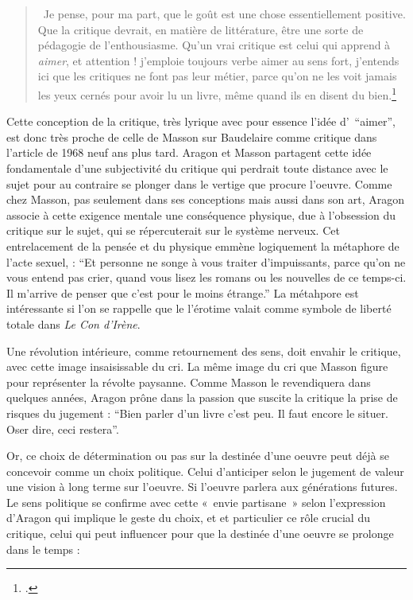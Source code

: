     \begin{quote}
       Je pense, pour ma part, que le goût est une chose essentiellement positive. Que la critique devrait, en matière de littérature, être une sorte de pédagogie de l’enthousiasme. Qu’un vrai critique est celui qui apprend à \emph{aimer}, et attention ! j’emploie toujours verbe aimer au sens fort, j’entends ici que les critiques ne font pas leur métier, parce qu’on ne les voit jamais les yeux cernés pour avoir lu un livre, même quand ils en disent du bien.\footcite{atraversgaleries}    
     \end{quote}


	 Cette conception de la critique, très lyrique avec pour essence l’idée d’ \enquote{aimer},  est donc très proche de celle de Masson sur Baudelaire comme critique dans l’article de 1968 neuf ans plus tard. Aragon et Masson partagent cette idée fondamentale d’une subjectivité du critique qui perdrait toute distance avec le sujet pour au contraire se plonger dans le vertige que procure l’oeuvre. Comme chez Masson, pas seulement dans ses conceptions mais aussi dans son art, Aragon associe à cette exigence mentale une conséquence physique, due à l’obsession du critique sur le sujet, qui se répercuterait sur le système nerveux. Cet entrelacement de la pensée et du physique emmène logiquement la métaphore de l’acte sexuel, : \enquote{Et personne ne songe à vous traiter d’impuissants, parce qu’on ne vous entend pas crier, quand vous lisez les romans ou les nouvelles de ce temps-ci. Il m’arrive de penser que c’est pour le moins étrange.} La métahpore est intéressante si l'on se rappelle que le l'érotime valait comme symbole de liberté totale dans \emph{Le Con d'Irène}. 

     	Une révolution intérieure, comme retournement des sens, doit envahir le critique, avec cette image insaisissable du cri. La même image du cri que Masson figure pour représenter la révolte paysanne. Comme Masson le revendiquera dans quelques années, Aragon prône dans la passion que suscite la critique la prise de risques du jugement : \enquote{Bien parler d’un livre c’est peu. Il faut encore le situer. Oser dire, ceci restera}. 

 Or, ce choix de détermination ou pas sur la destinée d’une oeuvre peut déjà se concevoir comme un choix politique. Celui d’anticiper selon le jugement de valeur une vision à long terme sur l’oeuvre. Si l’oeuvre parlera aux générations futures. Le sens politique se confirme avec cette « envie partisane » selon l’expression d’Aragon qui implique le geste du choix, et et particulier ce rôle crucial du critique, celui qui peut influencer pour que la destinée d’une oeuvre se prolonge dans le temps : 

